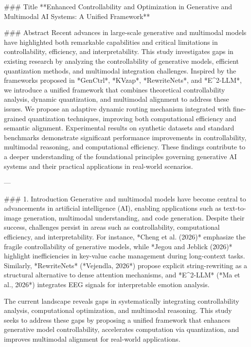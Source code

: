 ### Title
**Enhanced Controllability and Optimization in Generative and Multimodal AI Systems: A Unified Framework**

### Abstract
Recent advances in large-scale generative and multimodal models have highlighted both remarkable capabilities and critical limitations in controllability, efficiency, and interpretability. This study investigates gaps in existing research by analyzing the controllability of generative models, efficient quantization methods, and multimodal integration challenges. Inspired by the frameworks proposed in *GenCtrl*, *KVzap*, *RewriteNets*, and *E^2-LLM*, we introduce a unified framework that combines theoretical controllability analysis, dynamic quantization, and multimodal alignment to address these issues. We propose an adaptive dynamic routing mechanism integrated with fine-grained quantization techniques, improving both computational efficiency and semantic alignment. Experimental results on synthetic datasets and standard benchmarks demonstrate significant performance improvements in controllability, multimodal reasoning, and computational efficiency. These findings contribute to a deeper understanding of the foundational principles governing generative AI systems and their practical applications in real-world scenarios.

---

### 1. Introduction
Generative and multimodal models have become central to advancements in artificial intelligence (AI), enabling applications such as text-to-image generation, multimodal understanding, and code generation. Despite their success, challenges persist in areas such as controllability, computational efficiency, and interpretability. For instance, *Cheng et al. (2026)* emphasize the fragile controllability of generative models, while *Jegou and Jeblick (2026)* highlight inefficiencies in key-value cache management during long-context tasks. Similarly, *RewriteNets* (*Vejendla, 2026*) propose explicit string-rewriting as a structural alternative to dense attention mechanisms, and *E^2-LLM* (*Ma et al., 2026*) integrates EEG signals for interpretable emotion analysis.

The current landscape reveals gaps in systematically integrating controllability analysis, computational optimization, and multimodal reasoning. This study seeks to address these gaps by proposing a unified framework that enhances generative model controllability, accelerates computation via quantization, and improves multimodal alignment for real-world applications.

